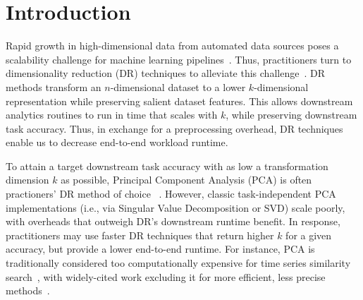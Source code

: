 
\section{Introduction}
\label{sec:intro}

Rapid growth in high-dimensional data from automated data sources poses a scalability challenge for machine learning pipelines~\cite{plato,macrobase-cidr}.
Thus, practitioners turn to dimensionality reduction (DR) techniques to alleviate this challenge~\cite{keogh-indexing,local-dr,decade,gemini}.
DR methods transform an $n$-dimensional dataset to a lower $k$-dimensional representation while preserving salient dataset features.
This allows downstream analytics routines to run in time that scales with $k$, while preserving downstream task accuracy.
Thus, in exchange for a preprocessing overhead, DR techniques enable us to decrease end-to-end workload runtime.


To attain a target downstream task accuracy with as low a transformation dimension $k$ as possible, Principal Component Analysis (PCA) is often practioners' DR method of choice ~\cite{jolbook}. 
However, classic task-independent PCA implementations (i.e., via Singular Value Decomposition or SVD) scale poorly, with overheads that outweigh DR's downstream runtime benefit. 
In response, practitioners may use faster DR techniques that return higher $k$ for a given accuracy, but provide a lower end-to-end runtime. 
For instance, PCA is traditionally considered too computationally expensive for time series similarity search~\cite{time-series-dm}, with widely-cited work excluding it for more efficient,  less precise methods~\cite{keogh-study}. 


